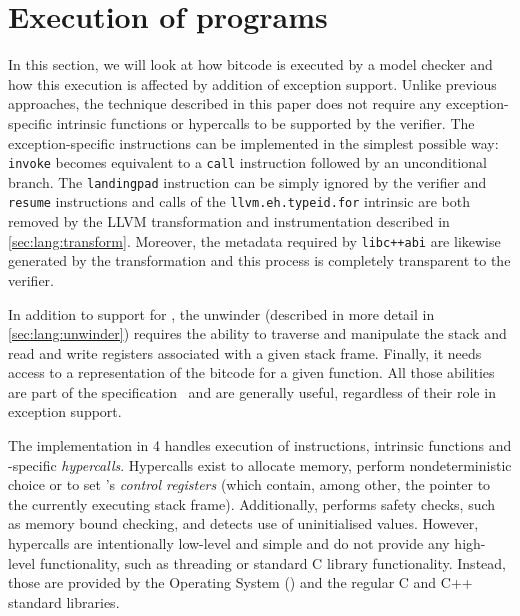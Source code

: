 \section{Execution of \llvm{} programs}\label{sec:execution}

In this section, we will look at how \llvm{} bitcode is executed by a model
checker and how this execution is affected by addition of exception
support. Unlike previous approaches, the technique described in this
paper does not require any exception-specific intrinsic functions or
hypercalls to be supported by the verifier. The exception-specific \llvm{}
instructions can be implemented in the simplest possible way:
\texttt{invoke} becomes equivalent to a \texttt{call} instruction
followed by an unconditional branch. The \texttt{landingpad} instruction
can be simply ignored by the verifier and \texttt{resume} instructions
and calls of the \texttt{llvm.eh.typeid.for} intrinsic are both removed
by the LLVM transformation and instrumentation described in
\autoref{sec:lang:transform}.
Moreover, the metadata required by \texttt{libc++abi} are likewise
generated by the \llvm{} transformation and this process is completely
transparent to the verifier.

In addition to support for \llvm{}, the unwinder (described in more detail
in \autoref{sec:lang:unwinder}) requires the ability to traverse and
manipulate the stack and read and write \llvm{} registers associated with a
given stack frame. Finally, it needs access to a representation of the
bitcode for a given function. All those abilities are part of the \divm{}
specification~ and are generally useful, regardless
of their role in exception support.

The \divm{} implementation in \divine{} 4 handles execution of \llvm{}
instructions, \llvm{} intrinsic functions and \divm{}-specific
\emph{hypercalls}. Hypercalls exist to allocate memory,
perform nondeterministic choice or to set \divm{}'s \emph{control
registers} (which contain, among other, the pointer to the currently
executing stack frame). Additionally, \divm{} performs safety checks, such
as memory bound checking, and detects use of uninitialised values.
However, \divm{} hypercalls are intentionally low-level and simple and do
not provide any high-level functionality, such as threading or standard
C library functionality. Instead, those are provided by the \divine{}
Operating System (\dios{}) and the regular C and C++ standard libraries.


